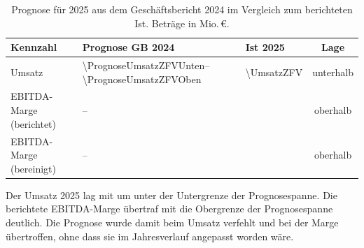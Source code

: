 \begin{table}[htbp]
\centering
\caption{Prognose f\"ur 2025 aus dem Gesch\"aftsbericht 2024 im Vergleich zum
berichteten Ist. Betr\"age in Mio.\,\euro.}
\label{tab:prognose-ist}
\begin{tabularx}{\linewidth}{@{}Xllc@{}}
\toprule
\textbf{Kennzahl} & \textbf{Prognose GB 2024} & \textbf{Ist 2025} & \textbf{Lage}\\
\midrule
Umsatz
  & \num{\PrognoseUmsatzZFVUnten}--\num{\PrognoseUmsatzZFVOben}
  & \num{\UmsatzZFV}
  & unterhalb\\
EBITDA-Marge (berichtet)
  & \Pct{\PrognoseMargeZFVUnten}--\Pct{\PrognoseMargeZFVOben}
  & \Pct{\EbitdaMargeBerichtetZFV}
  & oberhalb\\
EBITDA-Marge (bereinigt)
  & \Pct{\PrognoseMargeZFVUnten}--\Pct{\PrognoseMargeZFVOben}
  & \Pct{\EbitdaMargeZFV}
  & oberhalb\\
\bottomrule
\end{tabularx}
\end{table}

\noindent Der Umsatz 2025 lag mit \MioEUR{\UmsatzZFV} um
\PctBetrag{\PrognoseAbweichungUmsatz} unter der Untergrenze der
Prognosespanne. Die berichtete EBITDA-Marge \"ubertraf mit
\Pct{\EbitdaMargeBerichtetZFV} die Obergrenze der Prognosespanne
deutlich. Die Prognose wurde damit beim Umsatz verfehlt und
bei der Marge \"ubertroffen, ohne dass sie im Jahresverlauf angepasst worden
w\"are.
